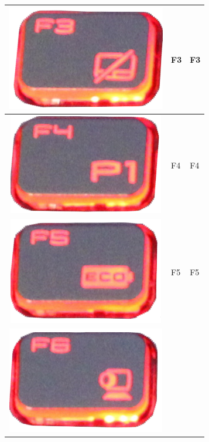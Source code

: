 \begin{longtable}{|cll|}
\begin{minipage}[c]{.3\textwidth}
\vspace{0.2cm}
\includegraphics[scale=0.06]{Images/KeyMapping/F3}
\vspace{0.2cm}
\end{minipage} & F3 & F3\\
\hline
\begin{minipage}[c]{.3\textwidth}
\vspace{0.2cm}
\includegraphics[scale=0.06]{Images/KeyMapping/F4}
\vspace{0.2cm}
\end{minipage} & F4 & F4\\
\hline
\begin{minipage}[c]{.3\textwidth}
\vspace{0.2cm}
\includegraphics[scale=0.06]{Images/KeyMapping/F5}
\vspace{0.2cm}
\end{minipage} & F5 & F5\\
\hline
\begin{minipage}[c]{.3\textwidth}
\vspace{0.2cm}
\includegraphics[scale=0.06]{Images/KeyMapping/F6}

\end{minipage}
\end{longtable}
